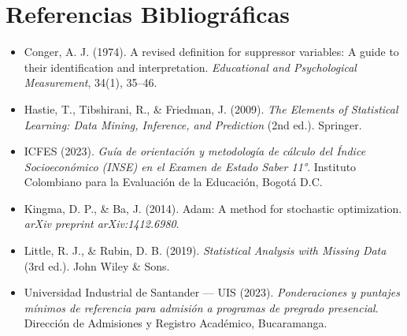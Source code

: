 \documentclass[11pt,letterpaper]{article}
\begin{document}
\section*{Referencias Bibliográficas}
\begin{itemize}
    \item Conger, A. J. (1974). A revised definition for suppressor variables: A guide to their identification and interpretation. \textit{Educational and Psychological Measurement}, 34(1), 35--46.
    \item Hastie, T., Tibshirani, R., \& Friedman, J. (2009). \textit{The Elements of Statistical Learning: Data Mining, Inference, and Prediction} (2nd ed.). Springer.
    \item ICFES (2023). \textit{Guía de orientación y metodología de cálculo del Índice Socioeconómico (INSE) en el Examen de Estado Saber 11°}. Instituto Colombiano para la Evaluación de la Educación, Bogotá D.C.
    \item Kingma, D. P., \& Ba, J. (2014). Adam: A method for stochastic optimization. \textit{arXiv preprint arXiv:1412.6980}.
    \item Little, R. J., \& Rubin, D. B. (2019). \textit{Statistical Analysis with Missing Data} (3rd ed.). John Wiley \& Sons.
    \item Universidad Industrial de Santander — UIS (2023). \textit{Ponderaciones y puntajes mínimos de referencia para admisión a programas de pregrado presencial}. Dirección de Admisiones y Registro Académico, Bucaramanga.
\end{itemize}
\end{document}
